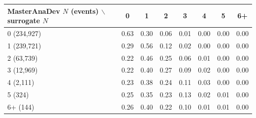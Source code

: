 \begin{tabular}{lccccccc}
\toprule
MasterAnaDev $N$ (events) $\backslash$ surrogate $N$ & 0 & 1 & 2 & 3 & 4 & 5 & 6+ \\
\midrule
0 (234,927) & 0.63 & 0.30 & 0.06 & 0.01 & 0.00 & 0.00 & 0.00 \\
1 (239,721) & 0.29 & 0.56 & 0.12 & 0.02 & 0.00 & 0.00 & 0.00 \\
2 (63,739) & 0.22 & 0.46 & 0.25 & 0.06 & 0.01 & 0.00 & 0.00 \\
3 (12,969) & 0.22 & 0.40 & 0.27 & 0.09 & 0.02 & 0.00 & 0.00 \\
4 (2,111) & 0.23 & 0.38 & 0.24 & 0.11 & 0.03 & 0.00 & 0.00 \\
5 (324) & 0.25 & 0.35 & 0.23 & 0.13 & 0.02 & 0.01 & 0.00 \\
6+ (144) & 0.26 & 0.40 & 0.22 & 0.10 & 0.01 & 0.01 & 0.00 \\
\bottomrule
\end{tabular}
